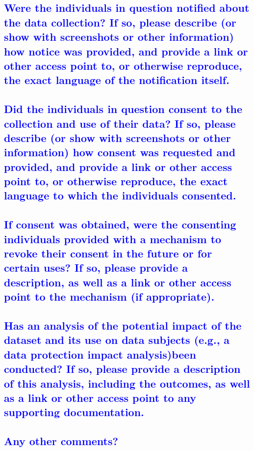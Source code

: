 \documentclass[letterpaper, 10 pt, conference]{ieeeconf}  %
\begin{document}
\textcolor{blue}{\subsection{Were the individuals in question notified about the data collection?
If so, please describe (or show with screenshots or other information) how
notice was provided, and provide a link or other access point to, or otherwise reproduce, the exact language of the notification itself.}}
\lipsum[1]

\textcolor{blue}{\subsection{Did the individuals in question consent to the collection and use of
their data? If so, please describe (or show with screenshots or other
information) how consent was requested and provided, and provide a link
or other access point to, or otherwise reproduce, the exact language to
which the individuals consented.}}
\lipsum[1]

\textcolor{blue}{\subsection{If consent was obtained, were the consenting individuals provided
with a mechanism to revoke their consent in the future or for certain
uses? If so, please provide a description, as well as a link or other access
point to the mechanism (if appropriate).}}
\lipsum[1]

\textcolor{blue}{\subsection{Has an analysis of the potential impact of the dataset and its use
on data subjects (e.g., a data protection impact analysis)been conducted? If so, please provide a description of this analysis, including the
outcomes, as well as a link or other access point to any supporting documentation.}}
\lipsum[1]

\textcolor{blue}{\subsection{Any other comments?}}
\lipsum[1]

\medskip
 
  

\end{document}
